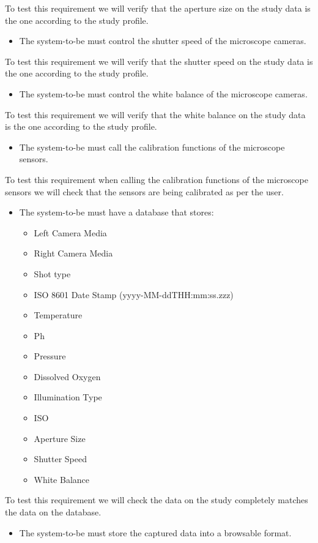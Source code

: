 To test this requirement we will verify that the aperture size on the study data is the one according to the study profile.
\begin{itemize}
    \item The system-to-be must control the shutter speed of the microscope cameras.
\end{itemize}
To test this requirement we will verify that the shutter speed on the study data is the one according to the study profile.
\begin{itemize}
    \item The system-to-be must control the white balance of the microscope cameras.
\end{itemize}
To test this requirement we will verify that the white balance on the study data is the one according to the study profile.
\begin{itemize}
    \item The system-to-be must call the calibration functions of the microscope sensors.
\end{itemize}
To test this requirement when calling the calibration functions of the microscope sensors we will check that the sensors are being calibrated as per the user.
\begin{itemize}
    \item The system-to-be must have a database that stores:
    \begin{itemize}
        \item Left Camera Media
        \item Right Camera Media
        \item Shot type
        \item ISO 8601 Date Stamp (yyyy-MM-ddTHH:mm:ss.zzz)
        \item Temperature
        \item Ph
        \item Pressure
        \item Dissolved Oxygen
        \item Illumination Type
        \item ISO
        \item Aperture Size
        \item Shutter Speed
        \item White Balance
    \end{itemize}
\end{itemize}
To test this requirement we will check the data on the study completely matches the data on the database.
\begin{itemize}
    \item The system-to-be must store the captured data into a browsable format.
\end{itemize}
